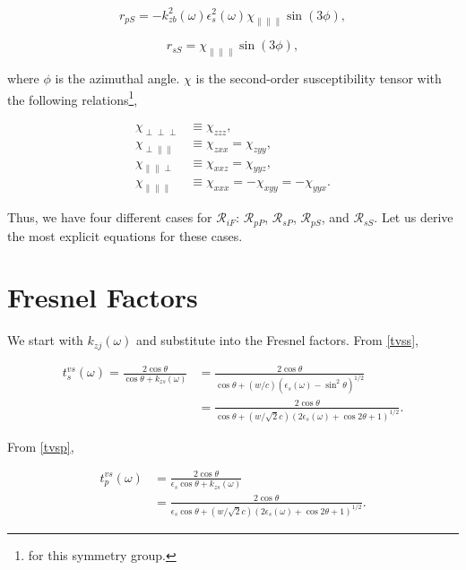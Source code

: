 \documentclass[10pt]{article}
\begin{document}
\begin{equation*}
r_{pS} = -k^{2}_{zb}(\omega)\epsilon^{2}_{s}(\omega)\chi_{\parallel\parallel\parallel}\sin(3\phi),
\end{equation*}

\begin{equation*}
r_{sS} = \chi_{\parallel\parallel\parallel}\sin(3\phi),
\end{equation*}

where $\phi$ is the azimuthal angle. $\chi$ is the second-order susceptibility tensor with the following relations\footnote{for this symmetry group.},

\begin{align}
\chi_{\perp\perp\perp}&\equiv\chi_{zzz}, \nonumber \\
\chi_{\perp\parallel\parallel}&\equiv\chi_{zxx}=\chi_{zyy}, \nonumber \\
\chi_{\parallel\parallel\perp}&\equiv\chi_{xxz}=\chi_{yyz}, \nonumber \\
\chi_{\parallel\parallel\parallel}&\equiv\chi_{xxx}=-\chi_{xyy}=-\chi_{yyx}.
\end{align}

Thus, we have four different cases for $\mathcal{R}_{iF}$: $\mathcal{R}_{pP}$, $\mathcal{R}_{sP}$, $\mathcal{R}_{pS}$, and $\mathcal{R}_{sS}$. Let us derive the most explicit equations for these cases.

\section{Fresnel Factors}

We start with $k_{zj}(\omega)$ and substitute into the Fresnel factors. From \eqref{tvss},

\begin{align*}
t^{vs}_{s}(\omega) = \frac{2\cos\theta}{\cos\theta + k_{zs}(\omega)} &= \frac{2\cos\theta}{\cos\theta + (w/c)(\epsilon_{s}(\omega) - \sin^{2}\theta)^{1/2}} \nonumber \\
&=\frac{2\cos\theta}{\cos\theta + (w/\sqrt{2}c)(2\epsilon_{s}(\omega) + \cos 2\theta + 1)^{1/2}}.
\end{align*}

From \eqref{tvsp},

\begin{align*}
t^{vs}_{p}(\omega) &= \frac{2\cos\theta}{\epsilon_{s}\cos\theta + k_{zs}(\omega)} \nonumber \\
&=\frac{2\cos\theta}{\epsilon_{s}\cos\theta + (w/\sqrt{2}c)(2\epsilon_{s}(\omega) + \cos 2\theta + 1)^{1/2}}.
\end{align*}
\end{document}
